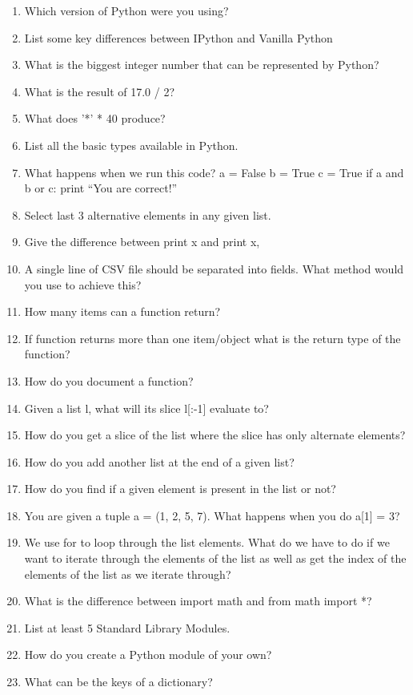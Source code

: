 \documentclass[a4paper,10pt]{book}
\begin{document}
\begin{enumerate}
  \item Which version of Python were you using? 
  \item List some key differences between IPython and Vanilla Python
  \item What is the biggest integer number that can be represented by Python?
  \item What is the result of 17.0 / 2?
  \item What does '*' * 40 produce?
  \item List all the basic types available in Python.
  \item What happens when we run this code?
  a = False
  b = True
  c = True
  if a and b or c:
      print ``You are correct!''
  \item Select last 3 alternative elements in any given list.
  \item Give the difference between print x and print x,
  \item A single line of CSV file should be separated into fields. What method would you use to achieve this?
  \item How many items can a function return?
  \item If function returns more than one item/object what is the return type of the function?
  \item How do you document a function?
  \item Given a list l, what will its slice l[:-1] evaluate to?
  \item How do you get a slice of the list where the slice has only alternate elements?
  \item How do you add another list at the end of a given list?
  \item How do you find if a given element is present in the list or not?
  \item You are given a tuple a = (1, 2, 5, 7). What happens when you do a[1] = 3?
  \item We use for to loop through the list elements. What do we have to do if we want to iterate through the elements of the list as well as get the index of the elements of the list as we iterate through?
  \item What is the difference between import math and from math import *?
  \item List at least 5 Standard Library Modules.
  \item How do you create a Python module of your own?
  \item What can be the keys of a dictionary?

\end{enumerate}
\end{document}
